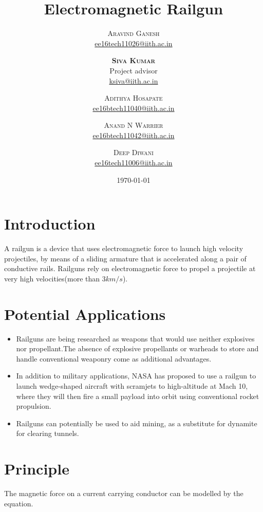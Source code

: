 \documentclass[twoside,twocolumn]{article}
\title{Electromagnetic Railgun} %
\author{%
\textsc{Aravind Ganesh}\\[1ex] %
\normalsize \href{mailto:ee16tech11026@iith.ac.in}{ee16tech11026@iith.ac.in}
\and %
\textsc{\textbf{Siva Kumar}}\\
 Project advisor\\
\normalsize \href{mailto:ksiva@iith.ac.in}{ksiva@iith.ac.in} %
\and %
\textsc{Adithya Hosapate}\\[1ex] %
\normalsize \href{mailto:ee16btech11040@iith.ac.in}{ee16btech11040@iith.ac.in} %
\and %
\textsc{Anand N Warrier}\\[1ex] %
\normalsize \href{mailto:ee16btech11042@iith.ac.in}{ee16btech11042@iith.ac.in} %
\and
\textsc{Deep Diwani}\\[1ex] %
\normalsize \href{mailto:ee16tech11006@iith.ac.in}{ee16tech11006@iith.ac.in}
}
\date{\today} %
\begin{document}
\maketitle


\section{Introduction}

	A railgun is a device that uses electromagnetic force to launch high velocity projectiles, by means of a sliding armature that is accelerated along a pair of conductive rails. Railguns rely on electromagnetic force to propel a projectile at very high velocities(more than $3 km/s$).


\section{Potential Applications}
\begin{itemize}

\item Railguns are being researched as weapons that would use neither explosives nor propellant.The absence of explosive propellants or warheads to store and handle conventional weaponry come as additional advantages.

\item In addition to military applications, NASA has proposed to use a railgun to launch wedge-shaped aircraft with scramjets to high-altitude at Mach 10, where they will then fire a small payload into orbit using conventional rocket propulsion.

\item Railguns can potentially be used to aid mining, as a substitute for dynamite for clearing tunnels. 

\end{itemize}


\section{Principle}

The magnetic force on a current carrying conductor can be modelled by the equation. 
	
\end{document}
